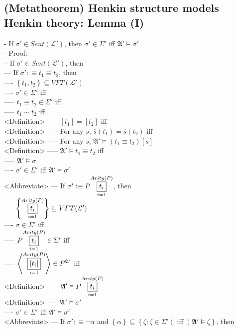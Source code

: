\documentclass{book}
\newcommand{\is}{:\equiv}
\newcommand{\txtiff}{\left(\text{ iff }\right)}
\newcommand{\means}[2]{#1^{#2}}
\newcommand{\extend}[1]{\overline{#1}}
\newcommand{\set}[1]{\left\{ #1 \right\}}
\newcommand{\seq}[1]{\left\langle #1 \right\rangle}
\newcommand{\vdc}[3]{\underset{#2}{\overset{#3}{\fbox{$#1$}}}}
\begin{document}
\subsection{(Metatheorem) Henkin structure models Henkin theory: Lemma (I)} %
	- If $\sigma' \in Sent(\mathcal{L}')$, then $\sigma' \in \Sigma'$ iff $\mathfrak{A}' \vDash \sigma'$ \\
	- Proof: \\
		-- If $\sigma' \in Sent(\mathcal{L}')$, then \\
			--- If $\sigma' \is t_1 \equiv t_2$, then \\
				---- $\set{t_1, t_2} \subseteq VFT(\mathcal{L}')$ \\
				---- $\sigma' \in \Sigma'$ iff \\
					----- $t_1 \equiv t_2 \in \Sigma'$ iff \\
					----- $t_1 \sim t_2$ iff \\ <Definition>
					----- $[t_1] = [t_2]$ iff \\ <Definition>
					----- For any $s$, $\extend{s}(t_1) = \extend{s}(t_2)$ iff \\ <Definition>
					----- For any $s$, $\mathfrak{A}' \vDash (t_1 \equiv t_2)[s]$ \\ <Definition>
					----- $\mathfrak{A}' \vDash t_1 \equiv t_2$ iff \\
					----- $\mathfrak{A}' \vDash \sigma$ \\
				---- $\sigma' \in \Sigma'$ iff $\mathfrak{A}' \vDash \sigma'$ \\ <Abbreviate>
			--- If $\sigma' \is P \vdc{t_i}{i=1}{Arity(P)}$, then \\
				---- $\set{\vdc{t_i}{i=1}{Arity(P)}} \subseteq VFT(\mathcal{L}')$ \\
				---- $\sigma \in \Sigma'$ iff \\
					----- $P \vdc{t_i}{i=1}{Arity(P)} \in \Sigma'$ iff \\
					----- $\seq{\vdc{[t_i]}{i=1}{Arity(P)}} \in \means{P}{\mathfrak{A}'}$ iff \\ <Definition>
					----- $\mathfrak{A}' \vDash P \vdc{t_i}{i=1}{Arity(P)}$ \\ <Definition>
					----- $\mathfrak{A}' \vDash \sigma'$ \\
				---- $\sigma' \in \Sigma'$ iff $\mathfrak{A}' \vDash \sigma'$ \\ <Abbreviate>
			--- If $\sigma' \is \lnot \alpha$ and $\set{\alpha} \subseteq \set{\zeta: \zeta \in \Sigma' \txtiff \mathfrak{A}' \vDash \zeta}$, then \\
\end{document}
